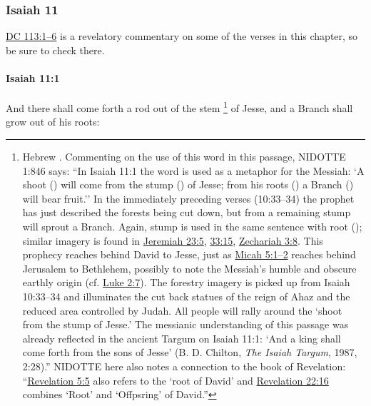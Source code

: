 	\subsubsection{Isaiah 11} %
		\label{ISAIAH-11}
		
			\hyperref[DC113-1]{DC 113:1--6} is a revelatory commentary on some of the verses in this chapter, so be sure to check there.

		\paragraph{Isaiah 11:1} %
			\label{ISAIAH-11-1}

			And there shall come forth a rod out of the stem%
				\footnote{%
					Hebrew . Commenting on the use of this word in this passage, NIDOTTE 1:846 says: ``In Isaiah 11:1 the word is used as a metaphor for the Messiah: `A shoot () will come from the stump () of Jesse; from his roots () a Branch () will bear fruit.'' In the immediately preceding verses (10:33--34) the prophet has just described the forests being cut down, but from a remaining stump will sprout a Branch. Again, stump is used in the same sentence with root (); similar imagery is found in \hyperref[JEREMIAH-23-5]{Jeremiah 23:5}, \hyperref[JEREMIAH-33-15]{33:15}, \hyperref[ZECHARIAH-3-8]{Zechariah 3:8}. This prophecy reaches behind David to Jesse, just as \hyperref[MICAH-5-1]{Micah 5:1--2} reaches behind Jerusalem to Bethlehem, possibly to note the Messiah's humble and obscure earthly origin (cf. \hyperref[LUKE-2-7]{Luke 2:7}). The forestry imagery is picked up from Isaiah 10:33--34 and illuminates the cut back statues of the reign of Ahaz and the reduced area controlled by Judah. All people will rally around the `shoot from the stump of Jesse.' The messianic understanding of this passage was already reflected in the ancient Targum on Isaiah 11:1: `And a king shall come forth from the sons of Jesse' (B. D. Chilton, \textit{The Isaiah Targum}, 1987, 2:28).'' NIDOTTE here also notes a connection to the book of Revelation: ``\hyperref[REVELATIONNT-5-5]{Revelation 5:5} also refers to the `root of David' and \hyperref[REVELATIONNT-22-16]{Revelation 22:16} combines `Root' and `Offpsring' of David.''
					}
			of Jesse, and a Branch shall grow out of his roots:

